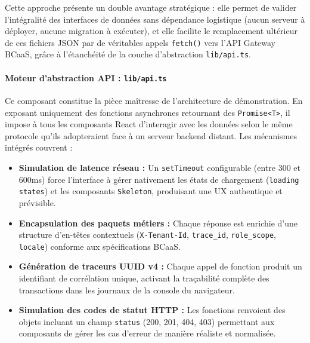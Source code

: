 \documentclass[12pt,a4paper]{report}
\begin{document}
\noindent
Cette approche présente un double avantage stratégique : elle permet de valider l'intégralité des interfaces de données sans dépendance logistique (aucun serveur à déployer, aucune migration à exécuter), et elle facilite le remplacement ultérieur de ces fichiers JSON par de véritables appels \texttt{fetch()} vers l'API Gateway BCaaS, grâce à l'étanchéité de la couche d'abstraction \texttt{lib/api.ts}.

\paragraph{Moteur d'abstraction API : \texttt{lib/api.ts}}

\noindent
Ce composant constitue la pièce maîtresse de l'architecture de démonstration. En exposant uniquement des fonctions asynchrones retournant des \texttt{Promise<T>}, il impose à tous les composants React d'interagir avec les données selon le même protocole qu'ils adopteraient face à un serveur backend distant. Les mécanismes intégrés couvrent :

\begin{itemize}[leftmargin=1.5cm, itemsep=5pt]
    \item \textbf{Simulation de latence réseau :} Un \texttt{setTimeout} configurable (entre 300 et 600ms) force l'interface à gérer nativement les états de chargement (\texttt{loading states}) et les composants \texttt{Skeleton}, produisant une UX authentique et prévisible.
    \item \textbf{Encapsulation des paquets métiers :} Chaque réponse est enrichie d'une structure d'en-têtes contextuels (\texttt{X-Tenant-Id}, \texttt{trace\_id}, \texttt{role\_scope}, \texttt{locale}) conforme aux spécifications BCaaS.
    \item \textbf{Génération de traceurs UUID v4 :} Chaque appel de fonction produit un identifiant de corrélation unique, activant la traçabilité complète des transactions dans les journaux de la console du navigateur.
    \item \textbf{Simulation des codes de statut HTTP :} Les fonctions renvoient des objets incluant un champ \texttt{status} (200, 201, 404, 403) permettant aux composants de gérer les cas d'erreur de manière réaliste et normalisée.
\end{itemize}
\end{document}
